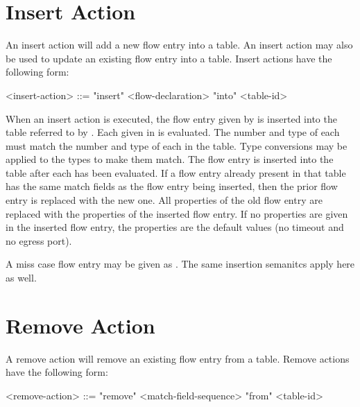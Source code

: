 \section{Insert Action} \label{guide:insert_flow}

An insert action will add a new flow entry into a table. An insert action may also be used to update an existing flow entry into a table. Insert actions have the following form:

\begin{minip}
\begin{grammar}
<insert-action> ::= "insert" <flow-declaration> "into" <table-id>
\end{grammar}
\end{minip}

When an insert action is executed, the flow entry given by  is inserted into the table referred to by . Each  given in  is evaluated. The number and type of each  must match the number and type of each  in the table. Type conversions may be applied to the types to make them match. The flow entry is inserted into the table after each  has been evaluated. If a flow entry already present in that table has the same match fields as the flow entry being inserted, then the prior flow entry is replaced with the new one. All properties of the old flow entry are replaced with the properties of the inserted flow entry. If no properties are given in the inserted flow entry, the properties are the default values (no timeout and no egress port).

A miss case flow entry may be given as . The same insertion semanitcs apply here as well.

\section{Remove Action} \label{guide:remove_flow}

A remove action will remove an existing flow entry from a table. Remove actions have the following form:

\begin{minip}
\begin{grammar}
<remove-action> ::= "remove" <match-field-sequence> "from" <table-id>
\end{grammar}
\end{minip}

